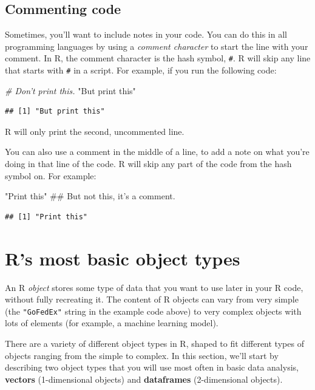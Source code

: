 \documentclass[]{book}
\makeatletter
\newenvironment{Shaded}{\begin{snugshade}}{\end{snugshade}}
\newcommand{\StringTok}[1]{\textcolor[rgb]{0.31,0.60,0.02}{#1}}
\newcommand{\CommentTok}[1]{\textcolor[rgb]{0.56,0.35,0.01}{\textit{#1}}}
\newcommand{\NormalTok}[1]{#1}
\newenvironment{kframe}{%
\medskip{}
\setlength{\fboxsep}{.8em}
 \def\at@end@of@kframe{}%
 \ifinner\ifhmode%
  \def\at@end@of@kframe{\end{minipage}}%
  \begin{minipage}{\columnwidth}%
 \fi\fi%
 \def\FrameCommand##1{\hskip\@totalleftmargin \hskip-\fboxsep
 \colorbox{shadecolor}{##1}\hskip-\fboxsep
     \hskip-\linewidth \hskip-\@totalleftmargin \hskip\columnwidth}%
 \MakeFramed {\advance\hsize-\width
   \@totalleftmargin\z@ \linewidth\hsize
   \@setminipage}}%
 {\par\unskip\endMakeFramed%
 \at@end@of@kframe}
\renewenvironment{Shaded}{\begin{kframe}}{\end{kframe}}
\theoremstyle{definition}
\theoremstyle{definition}
\theoremstyle{definition}
\theoremstyle{remark}
\makeatother
\begin{document}
\subsection{Commenting code}\label{commenting-code}

Sometimes, you'll want to include notes in your code. You can do this in
all programming languages by using a \emph{comment character} to start
the line with your comment. In R, the comment character is the hash
symbol, \texttt{\#}. R will skip any line that starts with \texttt{\#}
in a script. For example, if you run the following code:

\begin{Shaded}
\begin{Highlighting}[]
\CommentTok{# Don't print this.}
\StringTok{"But print this"}
\end{Highlighting}
\end{Shaded}

\begin{verbatim}
## [1] "But print this"
\end{verbatim}

R will only print the second, uncommented line.

You can also use a comment in the middle of a line, to add a note on
what you're doing in that line of the code. R will skip any part of the
code from the hash symbol on. For example:

\begin{Shaded}
\begin{Highlighting}[]
\StringTok{"Print this"}\NormalTok{ ## But not this, it's a comment.}
\end{Highlighting}
\end{Shaded}

\begin{verbatim}
## [1] "Print this"
\end{verbatim}

\section{R's most basic object types}\label{rs-most-basic-object-types}

An R \emph{object} stores some type of data that you want to use later
in your R code, without fully recreating it. The content of R objects
can vary from very simple (the \texttt{"GoFedEx"} string in the example
code above) to very complex objects with lots of elements (for example,
a machine learning model).

There are a variety of different object types in R, shaped to fit
different types of objects ranging from the simple to complex. In this
section, we'll start by describing two object types that you will use
most often in basic data analysis, \textbf{vectors} (1-dimensional
objects) and \textbf{dataframes} (2-dimensional objects).
\end{document}
